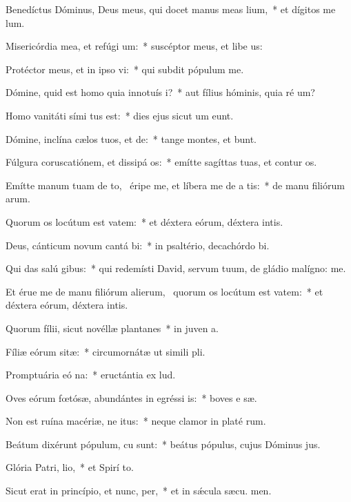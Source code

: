 \item Benedíctus Dóminus, Deus meus, qui docet manus meas  lium,~* et dígitos me  lum.
\item Misericórdia mea, et refúgi um:~* suscéptor meus, et libe us:
\item Protéctor meus, et in ipso vi:~* qui subdit pópulum   me.
\item Dómine, quid est homo quia innotuís i?~* aut fílius hóminis, quia ré um?
\item Homo vanitáti sími tus est:~* dies ejus sicut um eunt.
\item Dómine, inclína cælos tuos, et de:~* tange montes, et bunt.
\item Fúlgura coruscatiónem, et dissipá os:~* emítte sagíttas tuas, et contur os.
\item Emítte manum tuam de to,~\pscross{} éripe me, et líbera me de a tis:~* de manu filiórum arum.
\item Quorum os locútum est vatem:~* et déxtera eórum, déxtera intis.
\item Deus, cánticum novum cantá bi:~* in psaltério, decachórdo  bi.
\item Qui das salú gibus:~* qui redemísti David, servum tuum, de gládio malígno:  me.
\item Et érue me de manu filiórum alierum,~\pscross{} quorum os locútum est vatem:~* et déxtera eórum, déxtera intis.
\item Quorum fílii, sicut novéllæ plantanes~* in juven a.
\item Fíliæ eórum sitæ:~* circumornátæ ut simili pli.
\item Promptuária eó na:~* eructántia ex   lud.
\item Oves eórum fœtósæ, abundántes in egréssi is:~* boves e sæ.
\item Non est ruína macériæ, ne itus:~* neque clamor in platé rum.
\item Beátum dixérunt pópulum, cu  sunt:~* beátus pópulus, cujus Dóminus  jus.
\item Glória Patri,  lio,~* et Spirí to.
\item Sicut erat in princípio, et nunc,  per,~* et in sǽcula sæcu. men.
